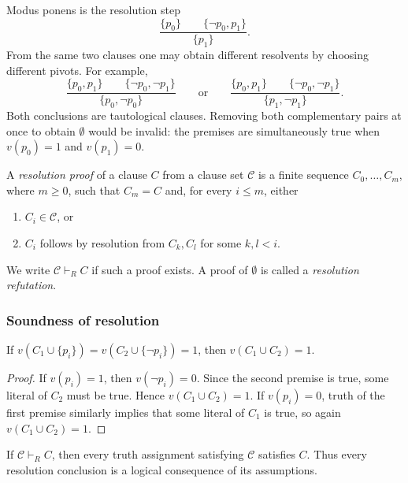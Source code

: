 \documentclass[11pt,a4paper]{amsart}
\begin{document}
\begin{example}
  Modus ponens is the resolution step
  \[
    \frac{\{p_0\}\qquad\{\neg p_0,p_1\}}{\{p_1\}}.
  \]
  From the same two clauses one may obtain different resolvents by choosing
  different pivots. For example,
  \[
    \frac{\{p_0,p_1\}\qquad\{\neg p_0,\neg p_1\}}
    {\{p_0,\neg p_0\}}
    \qquad\text{or}\qquad
    \frac{\{p_0,p_1\}\qquad\{\neg p_0,\neg p_1\}}
    {\{p_1,\neg p_1\}}.
  \]
  Both conclusions are tautological clauses. Removing both complementary
  pairs at once to obtain \(\emptyset\) would be invalid: the premises are
  simultaneously true when \(v(p_0)=1\) and \(v(p_1)=0\).
\end{example}

\begin{definition}
  A \emph{resolution proof} of a clause \(C\) from a clause set
  \(\mathcal C\) is a finite sequence \(C_0,\ldots,C_m\), where \(m\geq0\),
  such that \(C_m=C\) and, for every \(i\leq m\), either
  \begin{enumerate}
    \item \(C_i\in\mathcal C\), or
    \item \(C_i\) follows by resolution from \(C_k,C_l\) for some \(k,l<i\).
  \end{enumerate}
  We write \(\mathcal C\vdash_R C\) if such a proof exists.
  A proof of \(\emptyset\) is called a \emph{resolution refutation}.
\end{definition}

\subsubsection{Soundness of resolution}

\begin{lemma}
  If \(v(C_1\cup\{p_i\})=v(C_2\cup\{\neg p_i\})=1\), then
  \(v(C_1\cup C_2)=1\).
\end{lemma}

\begin{proof}
  If \(v(p_i)=1\), then \(v(\neg p_i)=0\). Since the second premise is
  true, some literal of \(C_2\) must be true. Hence \(v(C_1\cup C_2)=1\).
  If \(v(p_i)=0\), truth of the first premise similarly implies that some
  literal of \(C_1\) is true, so again \(v(C_1\cup C_2)=1\).
\end{proof}

\begin{theorem}[Soundness]
  If \(\mathcal C\vdash_R C\), then every truth assignment satisfying
  \(\mathcal C\) satisfies \(C\). Thus every resolution conclusion is a
  logical consequence of its assumptions.
\end{theorem}
\end{document}
